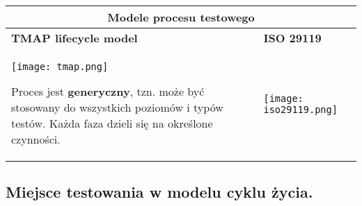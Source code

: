 \documentclass[../main.tex]{subfiles}
\begin{document}
    \begin{table}[H]
        \begin{center}
            \begin{tabular}{| p{8cm}| p{8cm}|}
                \hline
                \multicolumn{2}{|c|}{    \textbf{Modele procesu testowego}}\\
                \hline
                \textbf{TMAP lifecycle model} &  \textbf{ISO 29119}\\
                \hline

                \texttt{[image: tmap.png]}

                Proces jest \textbf{generyczny}, tzn. może być stosowany do wszystkich
                poziomów i typów testów. Każda faza dzieli się na określone czynności.
                &

                \texttt{[image: iso29119.png]}\\

                \hline

            \end{tabular}
        \end{center}
    \end{table}


    \subsection{Miejsce testowania w modelu cyklu życia.}
\end{document}
